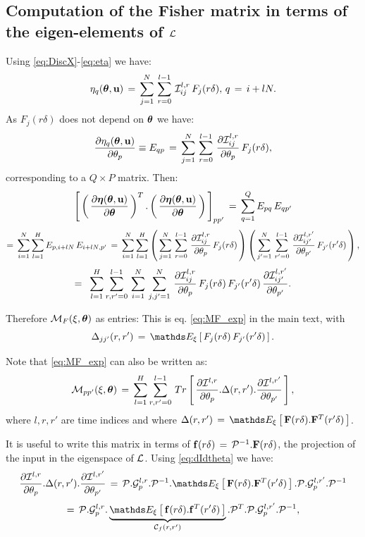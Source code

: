 \documentclass{article}
\begin{document}
\subsection{Computation of the Fisher matrix in terms of the eigen-elements of ${\mathcal L}$}\label{Sec:ComputeFisher}

Using \eqref{eq:DiscX}-\eqref{eq:eta} we have:
%
$$
\eta_q(\boldsymbol{\theta},\bold{u})\,=\, \sum_{j=1}^N \, \sum_{r=0}^{l-1} \, {\mathcal I}^{l,r}_{ij}\,F_j(r\delta), \, q\,=\, i+lN.
$$
%
As $F_j(r\delta)$ does not depend on $\boldsymbol{\theta}$ we have:
%
$$
\frac{\partial \eta_q(\boldsymbol{\theta},\bold{u})}{\partial \theta_p}
\equiv E_{qp}
\,=\,\sum_{j=1}^N \, \sum_{r=0}^{l-1} \, \frac{\partial {\mathcal I}^{l,r}_{ij}}{\partial \theta_p}\,F_j(r\delta),
$$
%
corresponding to a $Q \times P$ matrix. Then:
%
$$
\left[\, \left(\, \frac{\partial \boldsymbol{\eta}(\boldsymbol{\theta},\bold{u})}{\partial \boldsymbol{\theta}} \, \right)^T.\left(\, \frac{\partial \boldsymbol{\eta}(\boldsymbol{\theta},\bold{u})}{\partial \boldsymbol{\theta}} \, \right) \, \right]_{pp'}
\,=\, \sum_{q=1}^Q E_{pq}\,E_{qp'}
$$
$$=\, \sum_{i=1}^N \sum_{l=1}^H E_{p,i+lN}\,E_{i+lN,p'}
\,=\, \sum_{i=1}^N \sum_{l=1}^H \left(\, \sum_{j=1}^N \, \sum_{r=0}^{l-1} \, \frac{\partial {\mathcal I}^{l,r}_{ij}}{\partial \theta_p}\,F_j(r\delta) \, \right)
\left(\, \sum_{j'=1}^N \, \sum_{r'=0}^{l-1} \, \frac{\partial {\mathcal I}^{l,r'}_{ij'}}{\partial \theta_{p'}}\,F_{j'}(r'\delta) \, \right),
$$
%
$$
=\,\ \sum_{l=1}^H \sum_{r,r'=0}^{l-1} \, \sum_{i=1}^N \,\sum_{j,j'=1}^N \,\frac{\partial {\mathcal I}^{l,r}_{ij}}{\partial \theta_p}\,F_j(r\delta)\,F_{j'}(r'\delta)\, \frac{\partial {\mathcal I}^{l,r'}_{ij'}}{\partial \theta_{p'}}. 
$$

Therefore ${\mathcal M}_F(\xi,\boldsymbol{\theta})$ as entries:
%
%
This is eq. \eqref{eq:MF_exp} in the main text, with
%
$$
\Delta_{jj'}(r,r') \,=\, \Exp{\xi}{F_j(r\delta)\,F_{j'}(r'\delta) }.
$$


Note that \eqref{eq:MF_exp} can also be written as:
%
\begin{equation}\label{eq:Fisher_Trace}
{\mathcal M}_{pp'}(\xi,\boldsymbol{\theta})\,=\,  \sum_{l=1}^H \sum_{r,r'=0}^{l-1} \, Tr\left[\, \frac{\partial {\mathcal I}^{l,r}}{\partial \theta_p}.\Delta(r,r').\frac{\partial {\mathcal I}^{l,r'}}{\partial \theta_{p'}} \, \right],
\end{equation}
%
where $l,r,r'$ are time indices and where $\Delta(r,r')\,=\,\Exp{\xi}{\vF(r\delta).\vF^T(r'\delta)}$. 

It is useful to write this matrix in terms of $\bold{f}(r\delta)\,=\,{\mathcal P}^{-1}.\bold{F}(r\delta)$, the projection of the input in the eigenspace of ${\mathcal L}$.
Using \eqref{eq:dIdtheta} we have:
%
$$
\frac{\partial \cI^{l,r}}{\partial \theta_p}.\Delta(r,r').\frac{\partial \cI^{l,r'}}{\partial \theta_{p'}}
\,=\, \cP.\cG^{l,r}_p.\cP^{-1}.\Exp{\xi}{\vF(r\delta).\vF^T(r'\delta)}.\cP.\cG^{l,r'}_p.\cP^{-1}
$$
%
$$
=\, \cP.\cG^{l,r}_p.\underbrace{\Exp{\xi}{\vf(r\delta).\vf^T(r'\delta)}}_  {\cC_f(r,r')}.\cP^T.\cP.\cG^{l,r'}_p.\cP^{-1},
$$
\end{document}
